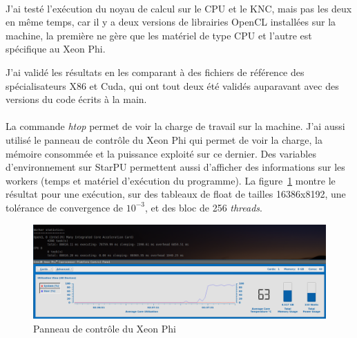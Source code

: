 \paragraph{}
J'ai testé l'exécution du noyau de calcul sur le CPU et le KNC, mais pas les
deux en même temps, car il y a deux versions de librairies OpenCL installées sur
la machine, la première ne gère que les matériel de type CPU et l'autre est
spécifique au Xeon Phi.

J'ai validé les résultats en les comparant à des fichiers de référence des
spécialisateurs X86 et Cuda, qui ont tout deux été validés auparavant avec des
versions du code écrits à la main.

\paragraph{}
La commande \emph{htop} permet de voir la charge de travail sur la machine. J'ai
aussi utilisé le panneau de contrôle du Xeon Phi qui permet de voir la charge,
la mémoire consommée et la puissance exploité sur ce dernier. Des variables
d'environnement sur StarPU permettent aussi d'afficher des informations sur les
workers (temps et matériel d'exécution du programme). La figure~\ref{micsmc_gui}
montre le résultat pour une exécution, sur des tableaux de float de tailles
16386x8192, une tolérance de convergence de $10^{-3}$, et des bloc de 256
\emph{threads}.

\begin{figure}[h]
   \begin{center}
      \includegraphics[scale=0.25]{./images/micsmc_gui.png}
   \end{center}
   \caption{Panneau de contrôle du Xeon Phi}
   \label{micsmc_gui}
\end{figure}

